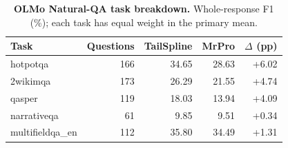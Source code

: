 \begin{table}[ht]
\centering\small
\caption{\textbf{OLMo Natural-QA task breakdown.} Whole-response F1 (\%); each task has equal weight in the primary mean.}
\label{tab:olmo-qa-new}
\begin{tabular}{@{}lrrrr@{}}
\toprule
Task & Questions & TailSpline & MrPro & $\Delta$ (pp) \\
\midrule
hotpotqa & 166 & 34.65 & 28.63 & +6.02 \\
2wikimqa & 173 & 26.29 & 21.55 & +4.74 \\
qasper & 119 & 18.03 & 13.94 & +4.09 \\
narrativeqa & 61 & 9.85 & 9.51 & +0.34 \\
multifieldqa\_en & 112 & 35.80 & 34.49 & +1.31 \\
\bottomrule
\end{tabular}
\end{table}

